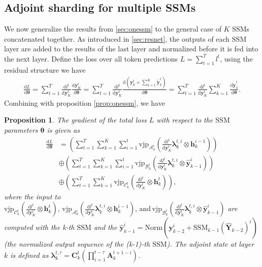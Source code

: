\documentclass{article}
\newtheorem{proposition}{{\bf Proposition}}
\newcommand{\A}{\mathcal{A}}
\newcommand{\B}{\mathcal{B}}
\newcommand{\C}{\mathcal{C}}
\newcommand{\ssm}{\mathrm{SSM}}
\newcommand{\vjp}{\mathrm{vjp}}
\newcommand{\diff}{\mathrm{d}}
\newcommand{\blambda}{\boldsymbol{\lambda}}
\begin{document}
\subsection{Adjoint sharding for multiple SSMs}
We now generalize the results from \autoref{sec:onessm} to the general case of $K$ $\ssm$s concatenated together. As introduced in \autoref{sec:resnet}, the outputs of each $\ssm$ layer are added to the results of the last layer and normalized before it is fed into the next layer. Define the loss over all token predictions $L = \sum_{t=1}^T l^t$, using the residual structure we have
\begin{align*}
    \frac{\diff L}{\diff \boldsymbol{\theta}} = \sum_{t=1}^T\frac{\diff l^t}{\diff \mathbf{y}_K^t}\frac{\diff \mathbf{y}_K^t}{\diff \boldsymbol{\theta}}= \sum_{t=1}^T\frac{\diff l^t}{\diff \mathbf{y}_K^t}\frac{\diff (\mathbf{y}_0^t+\sum_{k=1}^K \tilde{\mathbf{y}}_k^t)}{\diff \boldsymbol{\theta}} = \sum_{t=1}^T\frac{\diff l^t}{\diff \mathbf{y}_K^t}\sum_{k=1}^K\frac{\diff \tilde{\mathbf{y}}_k^t}{\diff \boldsymbol{\theta}}.
\end{align*}
Combining with proposition \ref{prop:onessm}, we have
\begin{proposition}
\label{prop:multssm}
The gradient of the total loss $L$ with respect to the $\ssm$ parameters $\boldsymbol{\theta}$ is given as
\begin{equation}
\begin{split}
    \frac{\diff L}{\diff \boldsymbol{\theta}} &= \left(\sum_{t=1}^T\sum_{k=1}^K \sum_{i=1}^{t}\vjp_{\boldsymbol{\A}^i_k}(\frac{\diff l^t}{\diff \mathbf{y}_K^t}\blambda^{t,i}_k\otimes \mathbf{h}^{i-1}_k)\right) \\
    &\oplus \left(\sum_{t=1}^T\sum_{k=1}^K \sum_{i=1}^{t}\vjp_{\boldsymbol{\B}^i_k}(\frac{\diff l^t}{\diff \mathbf{y}_K^t}\blambda^{t,i}_k\otimes \hat{\mathbf{y}}^i_{k-1})\right) \\
    &\oplus \left(\sum_{t=1}^T\sum_{k=1}^K \vjp_{\boldsymbol{\C}^t_k}(\frac{\diff l^t}{\diff \mathbf{y}_K^t}\otimes \mathbf{h}^t_k)\right),
\end{split}
\end{equation}
where the input to $\vjp_{\boldsymbol{\C}^t_k}(\frac{\diff l^t}{\diff \mathbf{y}_K^t}\otimes \mathbf{h}^t_k),\, \vjp_{\boldsymbol{\A}^i_k}(\frac{\diff l^t}{\diff \mathbf{y}_K^t}\blambda^{t,i}_k\otimes \mathbf{h}^{i-1}_k), \,\mathrm{and}\,\vjp_{\boldsymbol{\B}^i_k}(\frac{\diff l^t}{\diff \mathbf{y}_K^t}\blambda^{t,i}_k\otimes \hat{\mathbf{y}}^i_{k-1})$ are computed with the k-th $\ssm$ and the $\hat{\mathbf{y}}_{k-1}^i=\mathrm{Norm}(\mathbf{y}_{k-2}^i+\ssm_{k-1}(\hat{\mathbf{Y}}_{k-2})^i)$ (the normalized output sequence of the (k-1)-th $\ssm$). The adjoint state at layer $k$ is defined as $\blambda^{t,\tau}_k=\mathbf{C}^t_k(\prod_{i=1}^{t-\tau}\mathbf{A}_k^{t+1-i})$.
\end{proposition}
\end{document}
